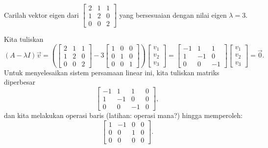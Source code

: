 \begin{example}
Carilah vektor eigen dari
$\left[ \begin{smallmatrix}
2 & 1 & 1 \\
1 & 2 & 0 \\
0 & 0 & 2
\end{smallmatrix} \right]$ yang bersesuaian dengan nilai eigen $\lambda = 3$.

Kita tuliskan
\begin{equation*}
(A-\lambda I) \vec{v} =
\left(
\begin{bmatrix}
2 & 1 & 1 \\
1 & 2 & 0 \\
0 & 0 & 2
\end{bmatrix}
- 3
\begin{bmatrix}
1 & 0 & 0 \\
0 & 1 & 0 \\
0 & 0 & 1
\end{bmatrix}
\right)
\begin{bmatrix}
v_1 \\ v_2 \\ v_3
\end{bmatrix}
=
\begin{bmatrix}
-1 & 1 & 1 \\
1 & -1 & 0 \\
0 & 0 & -1
\end{bmatrix}
\begin{bmatrix}
v_1 \\ v_2 \\ v_3
\end{bmatrix}
=
\vec{0} .
\end{equation*}
Untuk menyelesaikan
sistem persamaan linear ini,
kita tuliskan
matriks diperbesar
\begin{equation*}
\left[
\begin{array}{ccc|c}
-1 & 1 & 1 & 0 \\
1 & -1 & 0 & 0 \\
0 & 0 & -1 & 0
\end{array}
\right] ,
\end{equation*}
dan kita melakukan operasi baris (latihan: operasi mana?) hingga memperoleh:
\begin{equation*}
\left[
\begin{array}{ccc|c}
1 & -1 & 0 & 0 \\
0 & 0 & 1 & 0 \\
0 & 0 & 0 & 0
\end{array}
\right] .
\end{equation*}

\end{example}

